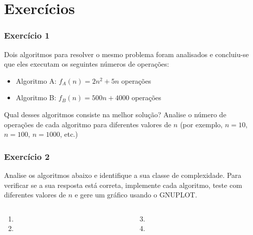\documentclass[aspectratio=169]{beamer}
\begin{document}
\section{Exercícios}

\begin{frame}\frametitle{Exercício 1}
Dois algoritmos para resolver o mesmo problema foram analisados e concluiu-se que eles executam os seguintes números de operações:\\
\begin{itemize}
	\item Algoritmo A: $f_{A}(n) = 2n^2 + 5n$ operações
	\item Algoritmo B: $f_{B}(n) = 500n + 4000$ operações
\end{itemize}
Qual desses algoritmos consiste na melhor solução? Analise o número de operações de cada algoritmo para diferentes valores de $n$ (por exemplo, $n = 10$, $n = 100$, $n = 1000$, etc.)
\end{frame}

\begin{frame}[fragile]\frametitle{Exercício 2}
Analise os algoritmos abaixo e identifique a sua classe de complexidade. Para verificar se a sua resposta está correta, implemente cada algoritmo, teste com diferentes valores de $n$ e gere um gráfico usando o GNUPLOT.
\vspace{-4mm}
\begin{columns}[T]
\begin{column}{0.5\linewidth}
\begin{enumerate}
	\item {\scriptsize}
\vspace{-4mm}
	\item {\scriptsize}
\end{enumerate}
\end{column}
\begin{column}{0.5\linewidth}
\begin{enumerate}
	\setcounter{enumi}{2}
	\item {\scriptsize}
\vspace{-4mm}
	\item {\scriptsize}
\end{enumerate}
	\end{column}
\end{columns}
\end{frame}
\end{document}
